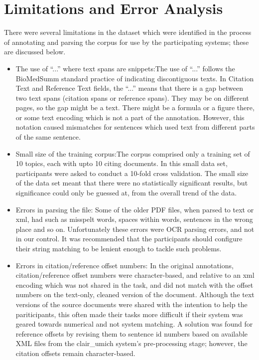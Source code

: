 \documentclass[11pt]{article}
\begin{document}
\section{Limitations and Error Analysis}
There were several limitations in the dataset which were identified in the process of annotating and parsing the corpus for use by the participating systems; these are discussed below.
\begin{itemize}
\item{The use of ``...'' where text spans are snippets}:The use of ``...'' follows the BioMedSumm standard practice of indicating discontiguous texts. In Citation Text and Reference Text fields, the ``...'' means that there is a gap between two text spans (citation spans or reference spans). They may be on different pages, so the gap might be a text. There might be a formula or a figure there, or some text encoding which is not a part of the annotation.
However, this notation caused mismatches for sentences which used text from different parts of the same sentence.
\item{Small size of the training corpus:}The corpus comprised only a training set of 10 topics, each with upto 10 citing documents. In this small data set, participants were asked to conduct a 10-fold cross validation. The small size of the data set meant that there were no statistically significant results, but significance could only be guessed at, from the overall trend of the data.
\item{Errors in parsing the file:} Some of the older PDF files, when parsed to text or xml, had such as misspelt words, spaces within words, sentences in the wrong place and so on. Unfortunately these errors were OCR parsing errors, and not in our control. It was recommended that the participants should configure their string matching to be lenient enough to tackle such problems.
\item{Errors in citation/reference offset numbers:} In the original annotations, citation/reference offset numbers were character-based, and relative to an xml encoding which was not shared in the task, and did not match with the offset numbers on the text-only, cleaned version of the document. Although the text versions of the source documents were shared with the intention to help the pariticipants, this often made their tasks more difficult if their system was geared towards numerical and not system matching. A solution was found for reference offsets by revising them to sentence id numbers based on available XML files from the clair\_umich system's pre-processing stage; however, the citation offsets remain character-based.

\end{itemize}
\end{document}

